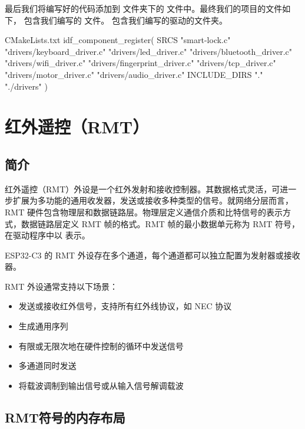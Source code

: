 \documentclass[lang=cn,newtx,10pt,scheme=chinese]{elegantbook}
\begin{document}
最后我们将编写好的代码添加到  文件夹下的  文件中。最终我们的项目的文件如下， 包含我们编写的  文件。 包含我们编写的驱动的文件夹。

\begin{mycode}{CMakeLists.txt}
idf_component_register(
    SRCS
        "smart-lock.c"
        "drivers/keyboard_driver.c"
        "drivers/led_driver.c"
        "drivers/bluetooth_driver.c"
        "drivers/wifi_driver.c"
        "drivers/fingerprint_driver.c"
        "drivers/tcp_driver.c"
        "drivers/motor_driver.c"
        "drivers/audio_driver.c"
    INCLUDE_DIRS
        "."
        "./drivers"
)
\end{mycode}

\chapter{红外遥控（RMT）}

\section{简介}

红外遥控（RMT）外设是一个红外发射和接收控制器。其数据格式灵活，可进一步扩展为多功能的通用收发器，发送或接收多种类型的信号。就网络分层而言，RMT 硬件包含物理层和数据链路层。物理层定义通信介质和比特信号的表示方式，数据链路层定义 RMT 帧的格式。RMT 帧的最小数据单元称为 RMT 符号，在驱动程序中以  表示。

ESP32-C3 的 RMT 外设存在多个通道，每个通道都可以独立配置为发射器或接收器。

RMT 外设通常支持以下场景：

\begin{itemize}
\item 发送或接收红外信号，支持所有红外线协议，如 NEC 协议
\item 生成通用序列
\item 有限或无限次地在硬件控制的循环中发送信号
\item 多通道同时发送
\item 将载波调制到输出信号或从输入信号解调载波
\end{itemize}

\section{RMT符号的内存布局}
\end{document}
